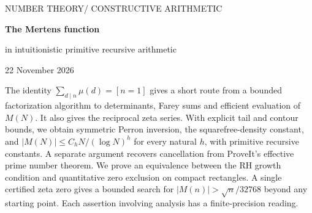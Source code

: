 \documentclass[11pt,letterpaper]{article}
\theoremstyle{reportthm}
\begin{document}
\thispagestyle{plain}
{\noindent\sffamily\color{tone}\small NUMBER THEORY\quad / \quad CONSTRUCTIVE ARITHMETIC\par}
\vspace{1.3em}
{\noindent\sffamily\bfseries\color{ink}\fontsize{28}{32}\selectfont The Mertens function\par}
\vspace{.35em}
{\noindent\large\sffamily in intuitionistic primitive recursive arithmetic\par}
\vspace{.7em}
{\noindent\small 22 November 2026\par}
\vspace{1em}
\noindent The identity $\sum_{d\mid n}\mu(d)=[n=1]$ gives a short route from a bounded factorization algorithm to determinants, Farey sums and efficient evaluation of $M(N)$. It also gives the reciprocal zeta series. With explicit tail and contour bounds, we obtain symmetric Perron inversion, the squarefree-density constant, and $|M(N)|\le C_hN/(\log N)^h$ for every natural $h$, with primitive recursive constants. A separate argument recovers cancellation from ProveIt's effective prime number theorem. We prove an equivalence between the RH growth condition and quantitative zero exclusion on compact rectangles. A single certified zeta zero gives a bounded search for $|M(n)|>\sqrt n/32768$ beyond any starting point. Each assertion involving analysis has a finite-precision reading.

\vspace{.8em}
\end{document}
